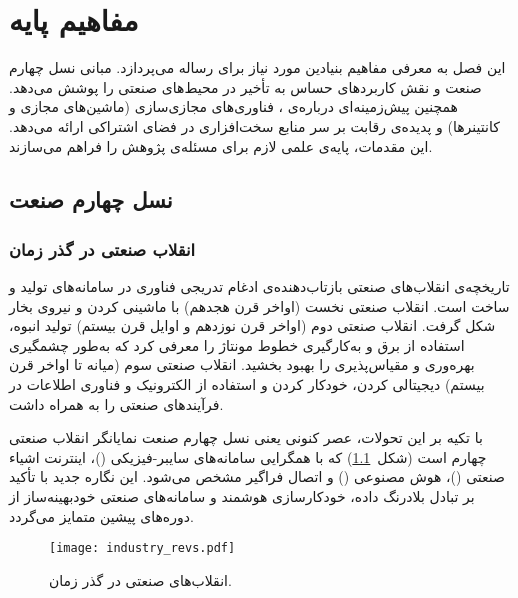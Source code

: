 
\chapter{مفاهیم پایه}\label{chap:pre}

این فصل به معرفی مفاهیم بنیادین مورد نیاز برای رساله می‌پردازد. مبانی نسل چهارم صنعت و نقش کاربردهای حساس به تأخیر در محیط‌های صنعتی را پوشش می‌دهد. همچنین پیش‌زمینه‌ای درباره‌ی ، فناوری‌های مجازی‌سازی (ماشین‌های مجازی و کانتینرها) و پدیده‌ی رقابت بر سر منابع سخت‌افزاری در فضای اشتراکی ارائه می‌دهد. این مقدمات، پایه‌ی علمی لازم برای مسئله‌ی پژوهش را فراهم می‌سازند.

\section{نسل چهارم صنعت}
\subsection{انقلاب صنعتی در گذر زمان}

تاریخچه‌ی انقلاب‌های صنعتی بازتاب‌دهنده‌ی ادغام تدریجی فناوری در سامانه‌های تولید و ساخت است. انقلاب صنعتی نخست (اواخر قرن هجدهم) با ماشینی کردن و نیروی بخار شکل گرفت. انقلاب صنعتی دوم (اواخر قرن نوزدهم و اوایل قرن بیستم) تولید انبوه، استفاده از برق و به‌کارگیری خطوط مونتاژ را معرفی کرد که به‌طور چشمگیری بهره‌وری و مقیاس‌پذیری را بهبود بخشید. انقلاب صنعتی سوم (میانه تا اواخر قرن بیستم) دیجیتالی‌ کردن، خودکار کردن و استفاده از الکترونیک و فناوری اطلاعات در فرآیندهای صنعتی را به همراه داشت\cite{Zhou2015Industry4}.

با تکیه بر این تحولات، عصر کنونی یعنی نسل چهارم صنعت نمایانگر انقلاب صنعتی چهارم است (شکل~\ref{figure:4IR_Revs}) که با همگرایی سامانه‌های سایبر-فیزیکی ()، اینترنت اشیاء صنعتی ()، هوش مصنوعی () و اتصال فراگیر مشخص می‌شود\cite{Aceto2019Survey}. این نگاره جدید با تأکید بر تبادل بلادرنگ داده، خودکارسازی هوشمند و سامانه‌های صنعتی خودبهینه‌ساز از دوره‌های پیشین متمایز می‌گردد.

\vspace{0.5cm}
\begin{figure}[h]
\centering
\texttt{[image: industry\_revs.pdf]}
\caption{انقلاب‌های صنعتی در گذر زمان\cite{Aceto2019Survey}.}
\label{figure:4IR_Revs}
\end{figure}
\vspace{0.5cm}

